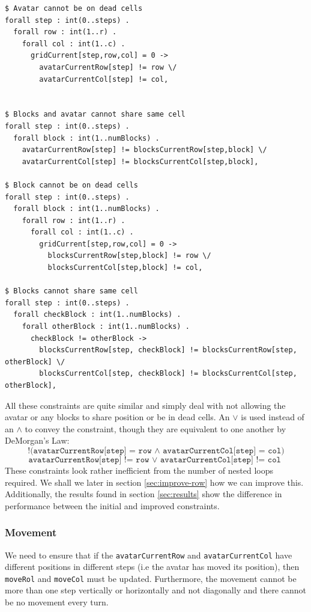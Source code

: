 \documentclass{article}
\begin{document}
\begin{lstlisting}[caption={Constraints to prevent invalid game states}, captionpos=b]
$ Avatar cannot be on dead cells
forall step : int(0..steps) .
  forall row : int(1..r) .
    forall col : int(1..c) .
	  gridCurrent[step,row,col] = 0 -> 
	    avatarCurrentRow[step] != row \/ 
	    avatarCurrentCol[step] != col,


$ Blocks and avatar cannot share same cell
forall step : int(0..steps) .
  forall block : int(1..numBlocks) .
    avatarCurrentRow[step] != blocksCurrentRow[step,block] \/
	avatarCurrentCol[step] != blocksCurrentCol[step,block],

$ Block cannot be on dead cells
forall step : int(0..steps) .
  forall block : int(1..numBlocks) .
    forall row : int(1..r) .
	  forall col : int(1..c) .
	    gridCurrent[step,row,col] = 0 -> 
	      blocksCurrentRow[step,block] != row \/
		  blocksCurrentCol[step,block] != col,

$ Blocks cannot share same cell				       
forall step : int(0..steps) .
  forall checkBlock : int(1..numBlocks) .
    forall otherBlock : int(1..numBlocks) .
	  checkBlock != otherBlock ->
	    blocksCurrentRow[step, checkBlock] != blocksCurrentRow[step, otherBlock] \/
		blocksCurrentCol[step, checkBlock] != blocksCurrentCol[step, otherBlock],
\end{lstlisting}
All these constraints are quite similar and simply deal with not allowing the avatar or any blocks to share position or be in dead cells. An $\vee$ is used instead of an $\wedge$ to convey the constraint, though they are equivalent to one another by DeMorgan's Law:
\begin{equation}
\texttt{!(avatarCurrentRow[step] = row $\wedge$ avatarCurrentCol[step] = col)}
\end{equation}
\begin{equation}
\texttt{avatarCurrentRow[step] != row $\vee$ avatarCurrentCol[step] != col\ }
\end{equation}
\noindent
These constraints look rather inefficient from the number of nested loops required. We shall we later in section \ref{sec:improve-row} how we can improve this. Additionally, the results found in section \ref{sec:results} show the difference in performance between the initial and improved constraints.


\subsubsection{Movement}
We need to ensure that if the \texttt{avatarCurrentRow} and \texttt{avatarCurrentCol} have different positions in different steps (i.e the avatar has moved its position), then \texttt{moveRol} and \texttt{moveCol} must be updated. Furthermore, the movement cannot be more than one step vertically or horizontally and not diagonally and there cannot be no movement every turn.
\end{document}
